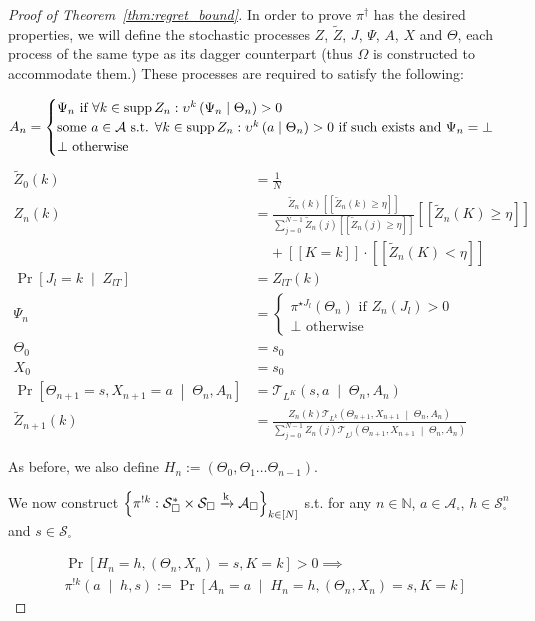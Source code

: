 \documentclass[anon,12pt]{colt2018} %
\DeclareMathOperator{\Supp}{supp}
\newcommand{\AP}[1]{\left(#1\right)}
\newcommand{\AC}[1]{\left\{#1\right\}}
\newcommand{\APM}[2]{\left(#1\;\middle\vert\;#2\right)}
\newcommand{\ABM}[2]{\left[#1\;\middle\vert\;#2\right]}
\newcommand{\CP}[3]{\underset{#1}{\operatorname{Pr}}\ABM{#2}{#3}}
\newcommand{\Nats}{\mathbb{N}}
\newcommand{\K}{\xrightarrow{\textnormal{k}}}
\newcommand{\A}{\mathcal{A}}
\newcommand{\St}{\mathcal{S}}
\newcommand{\T}{\mathcal{T}}
\newcommand{\Ad}{\upsilon}
\newcommand{\PoS}{:\St_\square^* \times \St_\square \K \A_\square}
\newcommand{\IP}{\pi^{!k}}
\begin{document}
\begin{proof}[Proof of Theorem~\ref{thm:regret_bound}]
In order to prove $\pi^\dagger$ has the desired properties, we will define the stochastic processes $Z$, $\tilde{Z}$, $J$, $\Psi$, $A$, $X$ and $\Theta$, each process of the same type as its dagger counterpart (thus $\Omega$ is constructed to accommodate them.) These processes are required to satisfy the following:

\[A_n = \begin{cases} \Psi_n \text{ if } \forall k \in \Supp{Z_n}: \Ad^k\APM{\Psi_n}{\Theta_n} > 0\\ \text{some } a\in\A \text{ s.t. } \forall k \in \Supp{Z_n}: \Ad^k\APM{a}{\Theta_n} > 0 \text{ if such exists and } \Psi_n=\bot\\\bot \text{ otherwise} \end{cases}\\\]
%
\begin{align*}
\tilde{Z}_0(k)&=\frac{1}{N} \\ 
Z_{n}(k) &= \frac{\tilde{Z}_{n}(k)[[\tilde{Z}_{n}(k) \geq \eta]] }{\sum_{j = 0}^{N-1}\tilde{Z}_{n}(j)[[\tilde{Z}_{n}(j) \geq \eta]]}[[\tilde{Z}_{n}(K) \geq \eta]] \\&\ \ \ \ \ + [[K = k]]\cdot [[\tilde{Z}_{n}(K) < \eta]]\\
\CP{}{J_{l} = k}{Z_{lT}} &= Z_{lT}\left(k\right)\\
\Psi_{n} &= \begin{cases} \pi^{\star J_l}\AP{\Theta_n} \text{ if } Z_n\AP{J_l} > 0 \\ \bot \text{ otherwise} \end{cases}\\
\Theta_0 &= s_0\\
X_0 &= s_0\\
\CP{}{\Theta_{n+1} = s,X_{n+1}=a}{\Theta_{n},A_n} &= \T_{L^K}\APM{s,a}{\Theta_n,A_n}\\
\tilde{Z}_{n+1}(k)&=\frac{Z_{n}(k) \T_{L^k}\APM{\Theta_{n+1},X_{n+1}}{\Theta_n,A_n}}{\sum_{j = 0}^{N-1} Z_n(j) \T_{L^j}\APM{\Theta_{n+1},X_{n+1}}{\Theta_n,A_n}}
\end{align*}

As before, we also define $H_n:=\AP{\Theta_0,\Theta_1\dots\Theta_{n-1}}$.

We now construct $\AC{\IP\PoS}_{k\in[N]}$ s.t. for any $n \in \Nats$, $a \in \A_\square$, $h \in \St_\square^n$ and $s\in\St_\square$

\begin{align*}
&\Pr\left[H_n=h,\AP{\Theta_n,X_n}=s,K=k\right] > 0 \implies\\
&\pi^{!k}\APM{a}{h,s}:=\CP{}{A_n=a}{H_n=h,\AP{\Theta_n,X_n}=s,K=k}
\end{align*}


\end{proof}
\end{document}
